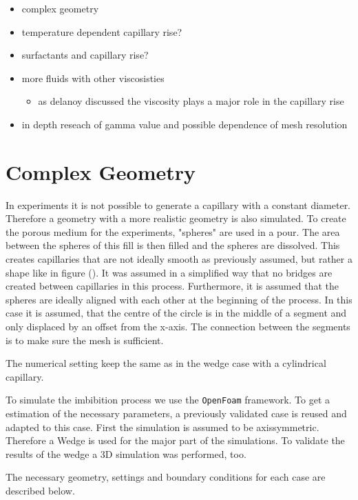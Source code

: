 \begin{itemize}
    \item complex geometry
    \item temperature dependent capillary rise?
    \item surfactants and capillary rise?
    \item more fluids with other viscosisties
    \begin{itemize}
        \item as delanoy discussed the viscosity plays a major role in the capillary rise
    \end{itemize}
    \item in depth reseach of gamma value and possible dependence of mesh resolution
\end{itemize}



\section{Complex Geometry}
In experiments it is not possible to generate a capillary with a constant diameter. Therefore a geometry with a more realistic geometry is also simulated. To create the porous medium for the experiments, "spheres" are used in a pour. The area between the spheres of this fill is then filled and the spheres are dissolved. This creates capillaries that are not ideally smooth as previously assumed, but rather a shape like in figure (). It was assumed in a simplified way that no bridges are created between capillaries in this process. Furthermore, it is assumed that the spheres are ideally aligned with each other at the beginning of the process.   
In this case it is assumed, that the centre of the circle is in the middle of a segment and only displaced by an offset from the x-axis. The connection between the segments is to make sure the mesh is sufficient. 

The numerical setting keep the same as in the wedge case with a cylindrical capillary. 


To simulate the imbibition process we use the \verb|OpenFoam| framework. To get a estimation of the necessary parameters, a previously validated case is reused and adapted to this case. First the simulation is assumed to be axissymmetric. Therefore a Wedge is used for the major part of the simulations. To validate the results of the wedge a 3D simulation was performed, too. 

The necessary geometry, settings and boundary conditions for each case are described below. 
